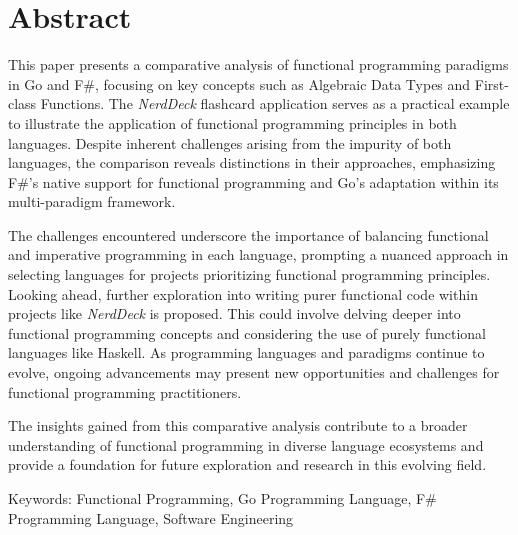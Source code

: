 \chapter*{Abstract}
\thispagestyle{empty}
This paper presents a comparative analysis of functional programming paradigms in Go and F\#, focusing on key concepts such as Algebraic Data Types and First-class Functions. The \textit{NerdDeck} flashcard application serves as a practical example to illustrate the application of functional programming principles in both languages. Despite inherent challenges arising from the impurity of both languages, the comparison reveals distinctions in their approaches, emphasizing F\#'s native support for functional programming and Go's adaptation within its multi-paradigm framework.

The challenges encountered underscore the importance of balancing functional and imperative programming in each language, prompting a nuanced approach in selecting languages for projects prioritizing functional programming principles. Looking ahead, further exploration into writing purer functional code within projects like \textit{NerdDeck} is proposed. This could involve delving deeper into functional programming concepts and considering the use of purely functional languages like Haskell. As programming languages and paradigms continue to evolve, ongoing advancements may present new opportunities and challenges for functional programming practitioners.

The insights gained from this comparative analysis contribute to a broader understanding of functional programming in diverse language ecosystems and provide a foundation for future exploration and research in this evolving field.

\bigskip

\noindent
Keywords: Functional Programming, Go Programming Language, F\# Programming Language, Software Engineering

